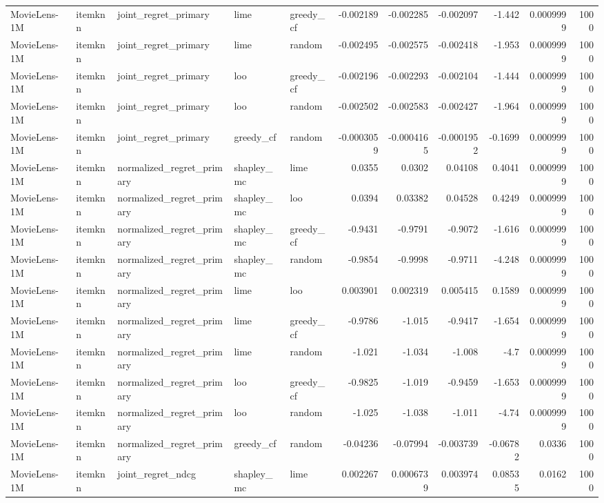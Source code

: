 \begin{table}[t]
\begin{tabular}{lllllrrrrrr}
MovieLens-1M & itemknn & joint\_regret\_primary & lime & greedy\_cf & -0.002189 & -0.002285 & -0.002097 & -1.442 & 0.0009999 & 1000 \\
MovieLens-1M & itemknn & joint\_regret\_primary & lime & random & -0.002495 & -0.002575 & -0.002418 & -1.953 & 0.0009999 & 1000 \\
MovieLens-1M & itemknn & joint\_regret\_primary & loo & greedy\_cf & -0.002196 & -0.002293 & -0.002104 & -1.444 & 0.0009999 & 1000 \\
MovieLens-1M & itemknn & joint\_regret\_primary & loo & random & -0.002502 & -0.002583 & -0.002427 & -1.964 & 0.0009999 & 1000 \\
MovieLens-1M & itemknn & joint\_regret\_primary & greedy\_cf & random & -0.0003059 & -0.0004165 & -0.0001952 & -0.1699 & 0.0009999 & 1000 \\
MovieLens-1M & itemknn & normalized\_regret\_primary & shapley\_mc & lime & 0.0355 & 0.0302 & 0.04108 & 0.4041 & 0.0009999 & 1000 \\
MovieLens-1M & itemknn & normalized\_regret\_primary & shapley\_mc & loo & 0.0394 & 0.03382 & 0.04528 & 0.4249 & 0.0009999 & 1000 \\
MovieLens-1M & itemknn & normalized\_regret\_primary & shapley\_mc & greedy\_cf & -0.9431 & -0.9791 & -0.9072 & -1.616 & 0.0009999 & 1000 \\
MovieLens-1M & itemknn & normalized\_regret\_primary & shapley\_mc & random & -0.9854 & -0.9998 & -0.9711 & -4.248 & 0.0009999 & 1000 \\
MovieLens-1M & itemknn & normalized\_regret\_primary & lime & loo & 0.003901 & 0.002319 & 0.005415 & 0.1589 & 0.0009999 & 1000 \\
MovieLens-1M & itemknn & normalized\_regret\_primary & lime & greedy\_cf & -0.9786 & -1.015 & -0.9417 & -1.654 & 0.0009999 & 1000 \\
MovieLens-1M & itemknn & normalized\_regret\_primary & lime & random & -1.021 & -1.034 & -1.008 & -4.7 & 0.0009999 & 1000 \\
MovieLens-1M & itemknn & normalized\_regret\_primary & loo & greedy\_cf & -0.9825 & -1.019 & -0.9459 & -1.653 & 0.0009999 & 1000 \\
MovieLens-1M & itemknn & normalized\_regret\_primary & loo & random & -1.025 & -1.038 & -1.011 & -4.74 & 0.0009999 & 1000 \\
MovieLens-1M & itemknn & normalized\_regret\_primary & greedy\_cf & random & -0.04236 & -0.07994 & -0.003739 & -0.06782 & 0.0336 & 1000 \\
MovieLens-1M & itemknn & joint\_regret\_ndcg & shapley\_mc & lime & 0.002267 & 0.0006739 & 0.003974 & 0.08535 & 0.0162 & 1000 \\

\end{tabular}
\end{table}
